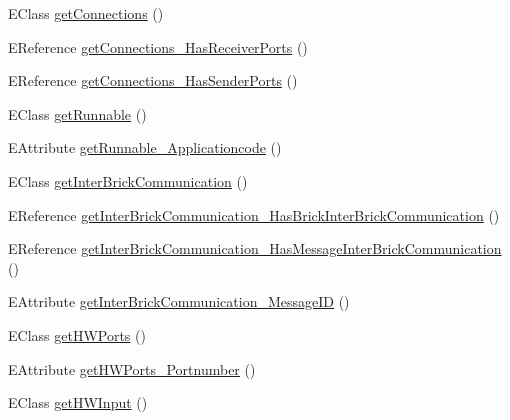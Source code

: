 \begin{DoxyCompactItemize}
\item 
E\-Class \hyperlink{classshootingmachineemfmodel_1_1impl_1_1_shootingmachineemfmodel_package_impl_a60e10b61ac1758c8993ad4ef5b5a192a}{get\-Connections} ()
\item 
E\-Reference \hyperlink{classshootingmachineemfmodel_1_1impl_1_1_shootingmachineemfmodel_package_impl_a78fc6dc05a87f9ca7fb11283ce72e317}{get\-Connections\-\_\-\-Has\-Receiver\-Ports} ()
\item 
E\-Reference \hyperlink{classshootingmachineemfmodel_1_1impl_1_1_shootingmachineemfmodel_package_impl_a534d0f6ac321df9ea722224b8c75ce53}{get\-Connections\-\_\-\-Has\-Sender\-Ports} ()
\item 
E\-Class \hyperlink{classshootingmachineemfmodel_1_1impl_1_1_shootingmachineemfmodel_package_impl_ab5b1e51f5d072672e318e4eb83d48e04}{get\-Runnable} ()
\item 
E\-Attribute \hyperlink{classshootingmachineemfmodel_1_1impl_1_1_shootingmachineemfmodel_package_impl_a524700ae80934bf154cbeec93667267f}{get\-Runnable\-\_\-\-Applicationcode} ()
\item 
E\-Class \hyperlink{classshootingmachineemfmodel_1_1impl_1_1_shootingmachineemfmodel_package_impl_a6dcf03b9cd465e27248a0278c6e55f11}{get\-Inter\-Brick\-Communication} ()
\item 
E\-Reference \hyperlink{classshootingmachineemfmodel_1_1impl_1_1_shootingmachineemfmodel_package_impl_ac8370919a033a361b9ad92fd84701afb}{get\-Inter\-Brick\-Communication\-\_\-\-Has\-Brick\-Inter\-Brick\-Communication} ()
\item 
E\-Reference \hyperlink{classshootingmachineemfmodel_1_1impl_1_1_shootingmachineemfmodel_package_impl_a059ce8aca2900334703351a36088df88}{get\-Inter\-Brick\-Communication\-\_\-\-Has\-Message\-Inter\-Brick\-Communication} ()
\item 
E\-Attribute \hyperlink{classshootingmachineemfmodel_1_1impl_1_1_shootingmachineemfmodel_package_impl_a52b993bce9574085ef39f2d1f45514d9}{get\-Inter\-Brick\-Communication\-\_\-\-Message\-I\-D} ()
\item 
E\-Class \hyperlink{classshootingmachineemfmodel_1_1impl_1_1_shootingmachineemfmodel_package_impl_a0e445554ec7e12a0acab69b315098594}{get\-H\-W\-Ports} ()
\item 
E\-Attribute \hyperlink{classshootingmachineemfmodel_1_1impl_1_1_shootingmachineemfmodel_package_impl_aacc8ccd1fdcf0a3828d6c4d8a4cd98ac}{get\-H\-W\-Ports\-\_\-\-Portnumber} ()
\item 
E\-Class \hyperlink{classshootingmachineemfmodel_1_1impl_1_1_shootingmachineemfmodel_package_impl_a2b76b45b62288e086096d893264e4232}{get\-H\-W\-Input} ()

\end{DoxyCompactItemize}
